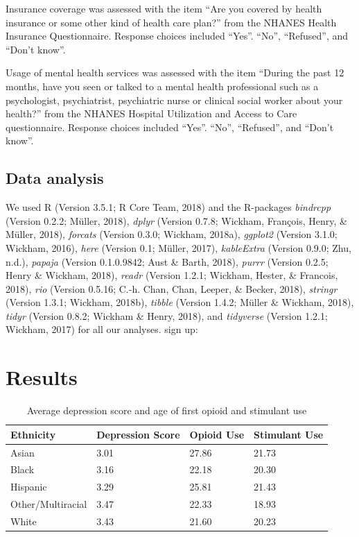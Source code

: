 \documentclass[man]{apa6}
\begin{document}
Insurance coverage was assessed with the item \enquote{Are you covered
by health insurance or some other kind of health care plan?} from the
NHANES Health Insurance Questionnaire. Response choices included
\enquote{Yes}. \enquote{No}, \enquote{Refused}, and \enquote{Don't
know}.

Usage of mental health services was assessed with the item
\enquote{During the past 12 months, have you seen or talked to a mental
health professional such as a psychologist, psychiatrist, psychiatric
nurse or clinical social worker about your health?} from the NHANES
Hospital Utilization and Access to Care questionnaire. Response choices
included \enquote{Yes}. \enquote{No}, \enquote{Refused}, and
\enquote{Don't know}.

\subsection{Data analysis}\label{data-analysis}

We used R (Version 3.5.1; R Core Team, 2018) and the R-packages
\emph{bindrcpp} (Version 0.2.2; Müller, 2018), \emph{dplyr} (Version
0.7.8; Wickham, François, Henry, \& Müller, 2018), \emph{forcats}
(Version 0.3.0; Wickham, 2018a), \emph{ggplot2} (Version 3.1.0; Wickham,
2016), \emph{here} (Version 0.1; Müller, 2017), \emph{kableExtra}
(Version 0.9.0; Zhu, n.d.), \emph{papaja} (Version 0.1.0.9842; Aust \&
Barth, 2018), \emph{purrr} (Version 0.2.5; Henry \& Wickham, 2018),
\emph{readr} (Version 1.2.1; Wickham, Hester, \& Francois, 2018),
\emph{rio} (Version 0.5.16; C.-h. Chan, Chan, Leeper, \& Becker, 2018),
\emph{stringr} (Version 1.3.1; Wickham, 2018b), \emph{tibble} (Version
1.4.2; Müller \& Wickham, 2018), \emph{tidyr} (Version 0.8.2; Wickham \&
Henry, 2018), and \emph{tidyverse} (Version 1.2.1; Wickham, 2017) for
all our analyses. sign up:

\section{Results}\label{results}

\begin{table}[tbp]
\begin{center}
\begin{threeparttable}
\caption{\label{tab:ST_table}Average depression score and age of first opioid and stimulant use}
\begin{tabular}{llll}
\toprule
Ethnicity & \multicolumn{1}{c}{Depression Score} & \multicolumn{1}{c}{Opioid Use} & \multicolumn{1}{c}{Stimulant Use}\\
\midrule
Asian & 3.01 & 27.86 & 21.73\\
Black & 3.16 & 22.18 & 20.30\\
Hispanic & 3.29 & 25.81 & 21.43\\
Other/Multiracial & 3.47 & 22.33 & 18.93\\
White & 3.43 & 21.60 & 20.23\\
\bottomrule
\end{tabular}
\end{threeparttable}
\end{center}
\end{table}
\end{document}
